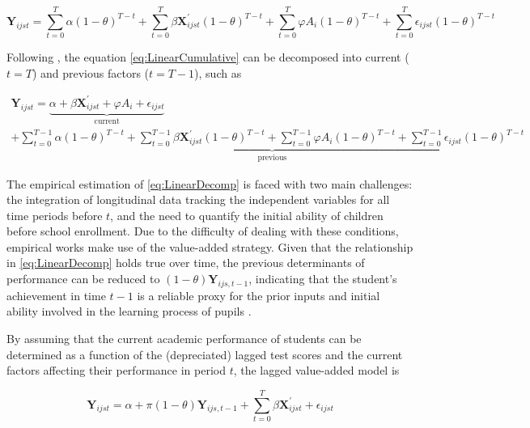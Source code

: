 \documentclass[a4paper, 12pt]{article}
\begin{document}
\begin{equation} \label{eq:LinearCumulative}
\mathbf{Y}_{ijst} = \sum_{t=0}^T \alpha (1 - \theta)^{T-t} + \sum_{t=0}^T \beta \mathbf{X}_{ijst}^{\prime} (1 - \theta)^{T-t} + \sum_{t=0}^T \varphi A_{i} (1 - \theta)^{T-t} + \sum_{t=0}^T \epsilon_{ijst} (1 - \theta)^{T-t}
\end{equation} 


Following \citet{hanushek2012distribution}, the equation \eqref{eq:LinearCumulative} can be decomposed into current ($t=T$) and previous factors ($t=T-1$), such as


\begin{multline} \label{eq:LinearDecomp}
\mathbf{Y}_{ijst} = \underbrace{\alpha + \beta\mathbf{X}_{ijst}^{\prime} + \varphi A_{i} + \epsilon_{ijst}}_{\text{current}} \\
+ \underbrace{\sum_{t=0}^{T-1} \alpha (1 - \theta)^{T-t} + \sum_{t=0}^{T-1} \beta \mathbf{X}_{ijst}^{\prime} (1 - \theta)^{T-t} + \sum_{t=0}^{T-1} \varphi A_{i} (1 - \theta)^{T-t}  + \sum_{t=0}^{T-1} \epsilon_{ijst} (1 - \theta)^{T-t}}_{\text{previous}}
\end{multline}


The empirical estimation of \eqref{eq:LinearDecomp} is faced with two main challenges: the integration of longitudinal data tracking the independent variables for all time periods before $t$, and the need to quantify the initial ability of children before school enrollment. Due to the difficulty of dealing with these conditions, empirical works make use of the value-added strategy. Given that the relationship in \eqref{eq:LinearDecomp} holds true over time, the previous determinants of performance can be reduced to $(1 - \theta) \mathbf{Y}_{ijs,t-1}$, indicating that the student's achievement in time $t-1$ is a reliable proxy for the prior inputs and initial ability involved in the learning process of pupils \citep{hanushek2012distribution, rothstein2010teacher, andrabi2009value}.

By assuming that the current academic performance of students can be determined as a function of the (depreciated) lagged test scores and the current factors affecting their performance in period $t$, the lagged value-added model is


\begin{equation} \label{eq:value-added}
\mathbf{Y}_{ijst} = \alpha + \pi (1 - \theta) \mathbf{Y}_{ijs,t-1} + \sum_{t=0}^T \beta \mathbf{X}_{ijst}^{\prime} + \epsilon_{ijst} 
\end{equation}
\end{document}
